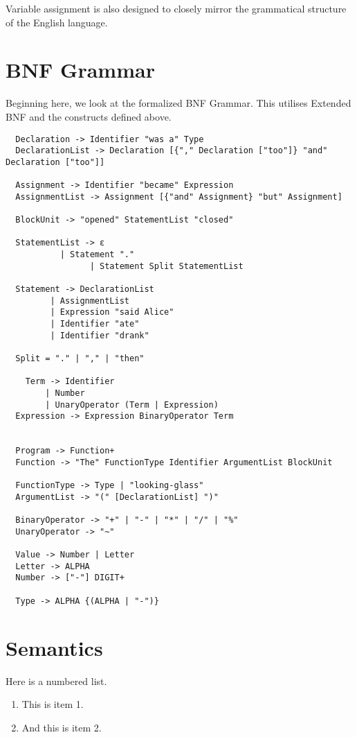 \documentclass[a4wide, 11pt]{article}
\begin{document}
Variable assignment is also designed to closely mirror the grammatical structure of the English language.

\section{BNF Grammar} 

Beginning here, we look at the formalized BNF Grammar. This utilises Extended BNF and the constructs defined above.

\begin{verbatim}
  Declaration -> Identifier "was a" Type
  DeclarationList -> Declaration [{"," Declaration ["too"]} "and" Declaration ["too"]]

  Assignment -> Identifier "became" Expression
  AssignmentList -> Assignment [{"and" Assignment} "but" Assignment]

  BlockUnit -> "opened" StatementList "closed"

  StatementList -> ε
           | Statement "."
                 | Statement Split StatementList
                 
  Statement -> DeclarationList
         | AssignmentList
         | Expression "said Alice"
         | Identifier "ate"
         | Identifier "drank"

  Split = "." | "," | "then"
 
    Term -> Identifier
        | Number
        | UnaryOperator (Term | Expression)
  Expression -> Expression BinaryOperator Term


  Program -> Function+
  Function -> "The" FunctionType Identifier ArgumentList BlockUnit

  FunctionType -> Type | "looking-glass"
  ArgumentList -> "(" [DeclarationList] ")"

  BinaryOperator -> "+" | "-" | "*" | "/" | "%"
  UnaryOperator -> "~" 

  Value -> Number | Letter
  Letter -> ALPHA
  Number -> ["-"] DIGIT+
  
  Type -> ALPHA {(ALPHA | "-")}

\end{verbatim}


\section{Semantics}

Here is a numbered list.

\begin{enumerate}

    \item
    This is item 1.
    
    \item
    And this is item 2.
    
\end{enumerate}
\end{document}
